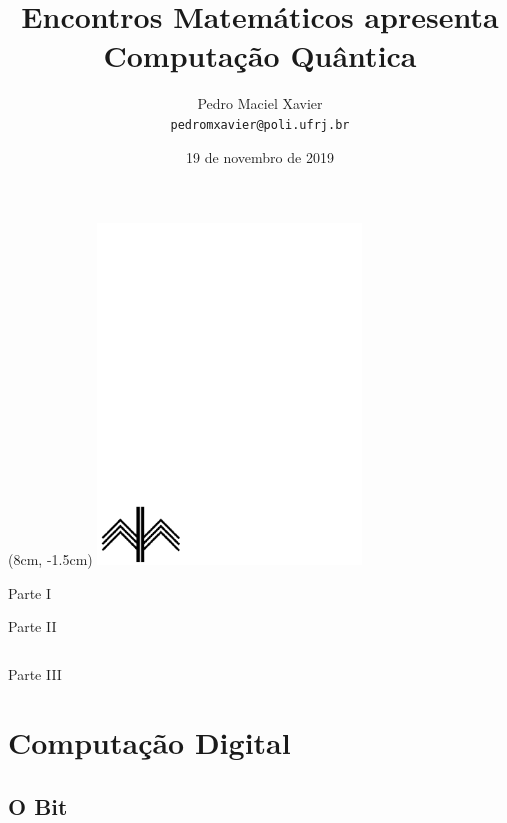 \documentclass[t]{beamer}
\title{
	{{\Large \textbf{Encontros Matemáticos}} {\small 	apresenta}}\\
\vspace{30pt}
{\huge Computação Quântica}
}
\institute{IM-UFRJ}
\date{19 de novembro de 2019}
\author{Pedro Maciel Xavier \\ \texttt{pedromxavier@poli.ufrj.br}}
\begin{document}
	\begin{frame}
		\titlepage
		\begin{textblock*}{7cm}(8cm, -1.5cm)
			\includegraphics[width=7cm]{im.pdf}
		\end{textblock*}
	\end{frame}
	
	\begin{frame}{Parte I}
  		\tableofcontents[sections={1}]
    \end{frame}

    \begin{frame}{Parte II}
    \begin{columns}[t]
        \begin{column}{.5\textwidth}
            \tableofcontents[sections={2}]
        \end{column}
        \begin{column}{.5\textwidth}
            \tableofcontents[sections={3-4}]
        \end{column}
    \end{columns}
	\end{frame}

    \begin{frame}{Parte III}
  		\tableofcontents[sections={5-}]
	\end{frame}
	
	

	\section{Computação Digital}
	
	\subsection{O Bit}
	
\end{document}
